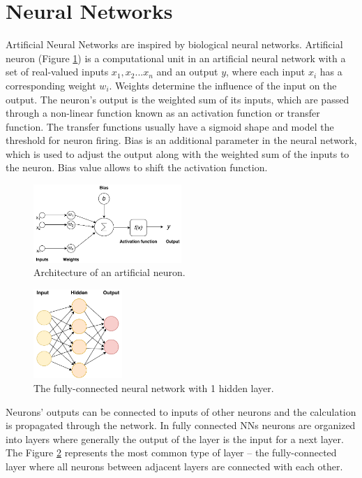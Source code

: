 \section{Neural Networks} \label{nn_section}
Artificial Neural Networks are inspired by biological neural networks. Artificial neuron (Figure \ref{neuron}) is a computational unit in an artificial neural network with a set of real-valued inputs $x_1, x_2 ... x_n$ and an output $y$, where each input $x_i$ has a corresponding weight $w_i$. Weights determine the influence of the input on the output. The neuron's output is the weighted sum of its inputs, which are passed through a non-linear function known as an activation function or transfer function. The transfer functions usually have a sigmoid shape and model the threshold for neuron firing. Bias is an additional parameter in the neural network, which is used to adjust the output along with the weighted sum of the inputs to the neuron. Bias value allows to shift the activation function.

\begin{figure}[hbt]
  \centering
  \includegraphics[width=0.5\textwidth]{figures/ai_neuron.pdf}
  \caption{Architecture of an artificial neuron.}
  \label{neuron}
\end{figure}

\begin{figure}[hbt]
  \centering
  \includegraphics[width=0.3\textwidth, height=0.2\textheight]{figures/nn.pdf}
  \caption{The fully-connected neural network with 1 hidden layer.}
  \label{nn}
\end{figure}

Neurons' outputs can be connected to inputs of other neurons and the calculation is propagated through the network. In fully connected NNs neurons are organized into layers where generally the output of the layer is the input for a next layer. The Figure \ref{nn} represents the most common type of layer -- the fully-connected layer where all neurons between adjacent layers are connected with each other.

